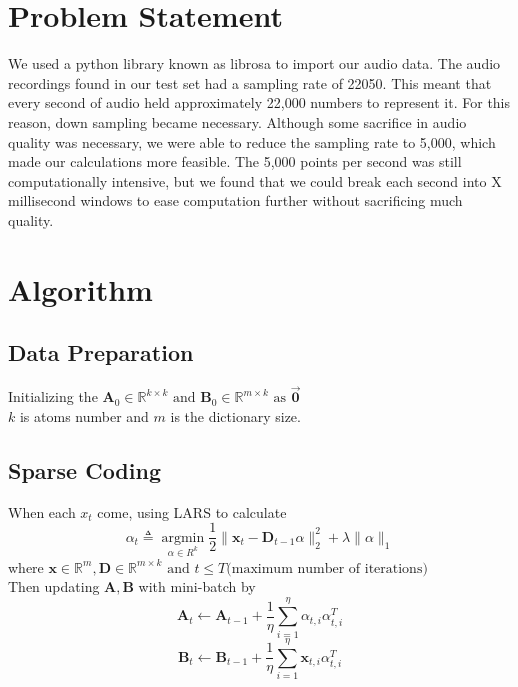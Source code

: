 \documentclass[UTF8]{article}
\begin{document}
\section{Problem Statement}
We used a python library known as librosa\cite{mcfee2015librosa} to import our audio data. The audio recordings found in our test set had a sampling rate of 22050. This meant that every second of audio held approximately 22,000 numbers to represent it. For this reason, down sampling became necessary. Although some sacrifice in audio quality was necessary, we were able to reduce the sampling rate to 5,000, which made our calculations more feasible. The 5,000 points per second was still computationally intensive, but we found that we could break each second into X millisecond windows to ease computation further without sacrificing much quality.


\section{Algorithm}

\subsection{Data Preparation}

Initializing the $\bm{A}_0 \in \mathbb{R}^{k \times k} \text{ and } \bm{B}_0 \in \mathbb{R}^{m \times k} \text{ as } \vec{\bm{0}} $\\
$k$ is atoms number and $m$ is the dictionary size.

\subsection{Sparse Coding}
When each $x_t$ come, using LARS\cite{scikit-learn} to calculate
\[
	\alpha_t \triangleq \mathop{\arg\min}\limits_{\alpha\in R^k} \frac{1}{2} \| \bm{x}_t - \bm{D}_{t-1} \alpha  \|^2_2 + \lambda \|\alpha\|_1
\]
where $\bm{x} \in \mathbb{R}^{m}, \bm{D} \in \mathbb{R}^{m \times k} \text{ and } t \leq T \text{(maximum number of iterations)}$
\\
Then updating $\bm{A}, \bm{B}$ with mini-batch by
\[\bm{A}_t \leftarrow \bm{A}_{t-1} + \frac{1}{\eta}\sum\limits_{i=1}^{\eta}\alpha_{t,i} \alpha_{t,i}^T\]
\[\bm{B}_t \leftarrow \bm{B}_{t-1} + \frac{1}{\eta}\sum\limits_{i=1}^{\eta}\bm{x}_{t,i} \alpha_{t,i}^T\]
\end{document}
